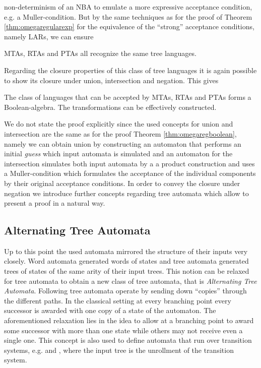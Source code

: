 non-determinism of an \ac{NBA} to emulate a more expressive acceptance 
condition, e.g. a Muller-condition. But by the same techniques as for the proof 
of Theorem \ref{thm:omegaregularexp} for the equivalence of the 
\enquote{strong} acceptance conditions, namely \acp{LAR}, we can ensure
\begin{theorem}
  \cite[Theorem 8.7]{AutoLogInfGames}
  \acp{MTA}, \acp{RTA} and \acp{PTA} all recognize the same tree languages.
  \label{thm:treeautoequiv}
\end{theorem}
Regarding the closure properties of this class of tree languages it is again
possible to show its closure under union, intersection and negation. This gives
\begin{theorem}
  \cite[Theorem 1.3]{SOTheoAndTrees}
  \cite[Theorem 1.5]{SOTheoAndTrees}
  The class of languages that can be accepted by \acp{MTA}, \acp{RTA} and 
  \acp{PTA} forms a Boolean-algebra. The transformations can be effectively
  constructed.
  \label{thm:treeautoboolean}
\end{theorem}
We do not state the proof explicitly since the used concepts for union and
intersection are the same as for the proof Theorem \ref{thm:omegaregboolean},
namely we can obtain union by constructing an automaton that performs an 
initial \emph{guess} which input automata is simulated and an automaton for the
intersection simulates both input automata by a a product construction and uses 
a Muller-condition which formulates the acceptance of the individual components 
by their original acceptance conditions. In order to convey the closure under
negation we introduce further concepts regarding tree automata which allow to
present a proof in a natural way.

\subsection{Alternating Tree Automata}
\label{subsec:ata}
Up to this point the used automata mirrored the structure of their inputs
very closely. Word automata generated words of states and tree automata 
generated trees of states of the same arity of their input trees. This notion 
can be relaxed for tree automata to obtain a new class of tree
automata, that is \emph{Alternating Tree Automata}. Following 
\cite{AltTreeAuto} tree automata operate by sending down \enquote{copies} 
through the different paths. In the classical setting at every branching point 
every successor is awarded with one copy of a state of the automaton. The 
aforementioned relaxation lies in the idea to allow at a branching point to 
award some successor with more than one state while others may not receive even 
a single one. This concept is also used to define automata that run over 
transition systems, e.g. \cite[Chapter 9]{AutoLogInfGames} and 
\cite{SynProbEnv}, where the input tree is the unrollment of the transition 
system.

